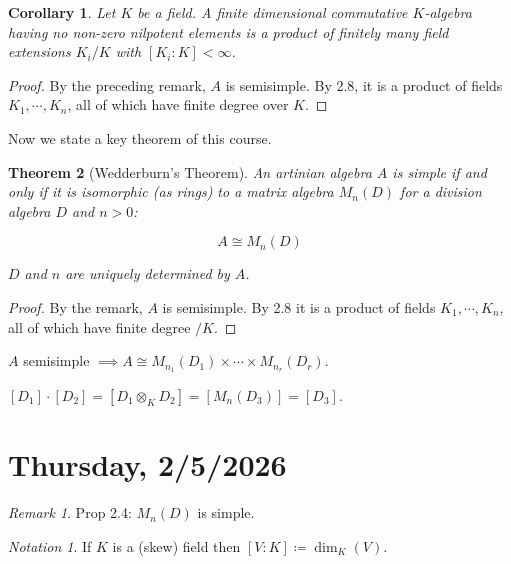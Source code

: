 \documentclass{article}
\theoremstyle{definition}
\theoremstyle{plain}
\newtheorem{theorem}{Theorem}[section]
\newtheorem{corollary}[theorem]{Corollary}
\theoremstyle{remark}
\newtheorem*{remark*}{Remark}
\newtheorem*{notation*}{Notation}
\begin{document}
    \begin{corollary}
        Let \(K\) be a field. A finite dimensional commutative \(K\)-algebra having no non-zero nilpotent elements is a product of finitely many field extensions \(K_i / K\) with \([K_i : K] < \infty\).
    \end{corollary}

    \begin{proof}
        By the preceding remark, \(A\) is semisimple. By 2.8, it is a product of fields \(K_1, \cdots , K_n\), all of which have finite degree over \(K\).
    \end{proof}

    Now we state a key theorem of this course.

    \begin{theorem}
        [Wedderburn's Theorem]

        An artinian algebra \(A\) is simple if and only if it is isomorphic (as rings) to a matrix algebra \(M_n(D)\) for a division algebra \(D\) and \(n > 0\):

        \[
            A \cong M_n(D)
        \]

        \(D\) and \(n\) are uniquely determined by \(A\).
    \end{theorem}

    \begin{proof}
        By the remark, \(A\) is semisimple. By 2.8 it is a product of fields \(K_1, \cdots , K_n\), all of which have finite degree \(/ K\).
    \end{proof}

    \(A\) semisimple \(\implies A \cong M_{n_1}(D_1) \times \cdots \times M_{n_r}(D_r)\).

    \([D_1] \cdot [D_2] = [D_1 \otimes_K D_2] = [M_n(D_3)] = [D_3]\). 
    
    \section*{Thursday, 2/5/2026}
    
    \begin{remark*}
        Prop 2.4: \(M_n(D)\) is simple.
    \end{remark*}

    \begin{notation*}
        If \(K\) is a (skew) field then \([V:K] \coloneqq \dim_K(V)\).
    \end{notation*}
\end{document}
